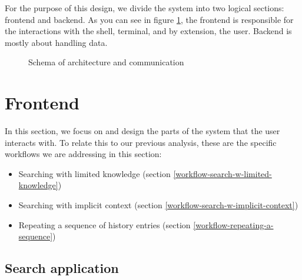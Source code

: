 For the purpose of this design, we divide the system into two logical sections: frontend and backend. As you can see in figure \ref{design-architecture-layers}, the frontend is responsible for the interactions with the shell, terminal, and by extension, the user. Backend is mostly about handling data. 

\begin{figure}[h!]
\centering
{}
\caption{Schema of architecture and communication}
\label{design-architecture-layers}
\end{figure}

\newpage
\section{Frontend}\label{design-frontend}

In this section, we focus on and design the parts of the system that the user interacts with. 
To relate this to our previous analysis, these are the specific workflows we are addressing in this section:

\begin{itemize}
\item Searching with limited knowledge (section \ref{workflow-search-w-limited-knowledge})
\item Searching with implicit context (section \ref{workflow-search-w-implicit-context})
\item Repeating a sequence of history entries (section \ref{workflow-repeating-a-sequence})
\end{itemize}

\subsection{Search application}

